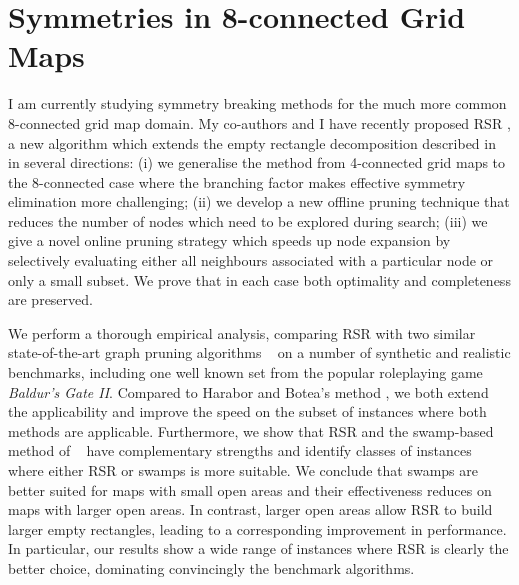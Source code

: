 \section{Symmetries in 8-connected Grid Maps}
I am currently studying symmetry breaking methods for the much more 
common 8-connected grid map domain.
My co-authors and I have recently proposed RSR \cite{harabor11a}, a new algorithm
which extends the empty rectangle decomposition described in \cite{harabor10} in
several directions: (i) we generalise the method from 4-connected grid maps to
the 8-connected case where the branching factor makes effective symmetry
elimination more challenging; (ii) we develop a new offline pruning technique
that reduces the number of nodes which need to be explored during search; (iii)
we give a novel online pruning strategy which speeds up node expansion by
selectively evaluating either all neighbours associated with a particular node
or only a small subset.  We prove that in each case both optimality and
completeness are preserved.
\par
We perform a thorough empirical analysis, comparing RSR with two similar
state-of-the-art graph pruning algorithms ~\cite{pochter10,harabor10}
on a number of synthetic and realistic benchmarks, including one well known set 
from the popular roleplaying game \emph{Baldur's Gate II}.
Compared to Harabor and Botea's method , 
we both extend the applicability and improve the speed
on the subset of instances where both methods are applicable.
Furthermore, we show that RSR and the swamp-based method of 
\citeauthor{pochter10}~
have complementary strengths and identify classes of instances where
either RSR or swamps is more suitable.
We conclude that swamps are better suited for maps with
small open areas and their effectiveness reduces on maps with larger open areas.
In contrast, larger open areas allow RSR to build larger empty rectangles,
leading to a corresponding improvement in performance.
In particular, our results show a wide range of instances where
RSR is clearly the better choice, dominating convincingly the benchmark algorithms.
